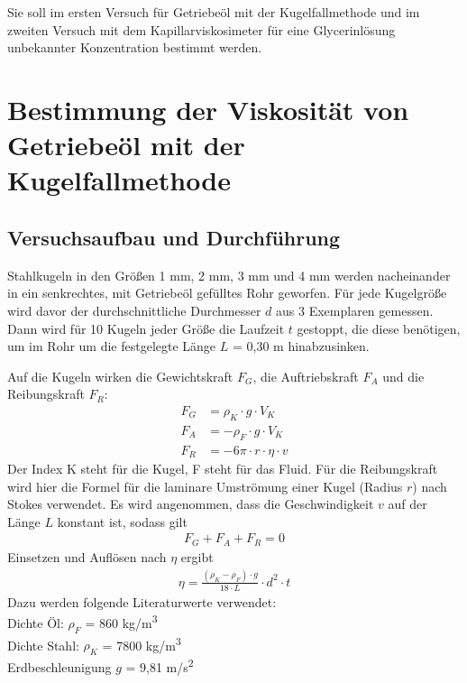 \documentclass{scrartcl}
\begin{document}
Sie soll im ersten Versuch für Getriebeöl mit der Kugelfallmethode und im zweiten Versuch mit dem Kapillarviskosimeter für eine Glycerinlösung unbekannter Konzentration bestimmt werden.




\pagebreak
\section{Bestimmung der Viskosität von Getriebeöl mit der Kugelfallmethode}
\subsection{Versuchsaufbau und Durchführung}
Stahlkugeln in den Größen 1 mm, 2 mm, 3 mm und 4 mm werden nacheinander in ein senkrechtes, mit Getriebeöl gefülltes Rohr geworfen. Für jede Kugelgröße wird davor der durchschnittliche Durchmesser $d$ aus 3 Exemplaren gemessen. Dann wird für 10 Kugeln jeder Größe die Laufzeit $t$ gestoppt, die diese benötigen, um im Rohr um die festgelegte Länge $L$ = 0,30 m hinabzusinken.

Auf die Kugeln wirken die Gewichtskraft $F_{G}$, die Auftriebskraft $F_{A}$ und die Reibungskraft $F_{R}$:
\begin{align}
F_{G} &= \rho_{K} \cdot g \cdot V_{K} \\
F_{A} &= -\rho_{F} \cdot g \cdot V_{K} \\
F_{R} &= -6 \pi \cdot r \cdot \eta \cdot v
\end{align}
Der Index K steht für die Kugel, F steht für das Fluid. Für die Reibungskraft wird hier die Formel für die laminare Umströmung einer Kugel (Radius $r$) nach Stokes verwendet. Es wird angenommen, dass die Geschwindigkeit $v$ auf der Länge $L$ konstant ist, sodass gilt
\begin{align}
F_{G} + F_{A} + F_{R} = 0
\end{align}
Einsetzen und Auflösen nach $\eta$ ergibt
\begin{align}
\eta = \frac{(\rho_{K} - \rho_{F}) \cdot g}{18 \cdot L} \cdot d^2 \cdot t
\label{Viskos}
\end{align}
Dazu werden folgende Literaturwerte verwendet: \\
Dichte Öl: $\rho_{F}$ = 860 kg/m\textsuperscript{3} \\
Dichte Stahl: $\rho_{K}$ = 7800 kg/m\textsuperscript{3} \\
Erdbeschleunigung $g$ = 9,81 m/s\textsuperscript{2}
\end{document}
